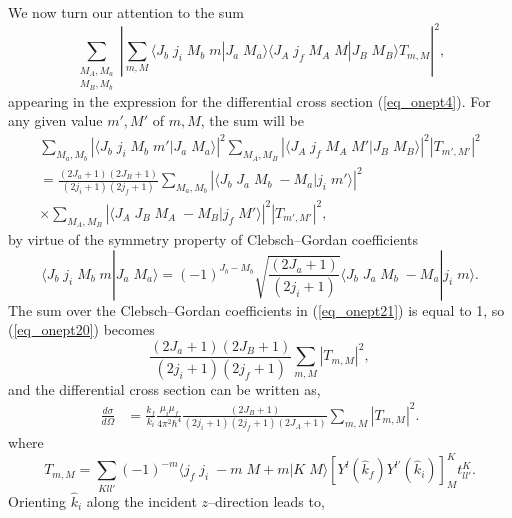 We now turn our attention to the sum
\begin{equation}\label{eq_onept20}
\sum_{\substack{M_A,M_a\\M_B,M_b}}\left|\sum_{m,M}\langle J_b\;j_i\;M_b\;m|J_a\;M_a\rangle\langle J_A\;j_f\;M_A\;M|J_B\;M_B\rangle T_{m,M}\right|^2,
\end{equation}
appearing in the expression for the differential cross section (\ref{eq_onept4}). For any given value $m',M'$ of $m,M$, the sum will be
\begin{multline}\label{eq_onept21}
\sum_{M_a,M_b}\left|\langle J_b\;j_i\;M_b\;m'|J_a\;M_a\rangle\right|^2\sum_{M_A,M_B}\left|\langle J_A\;j_f\;M_A\;M'|J_B\;M_B\rangle\right|^2 \left|T_{m',M'}\right|^2\\
=\frac{(2J_a+1)(2J_B+1)}{(2j_i+1)(2j_f+1)}\sum_{M_a,M_b}\left|\langle J_b\;J_a\;M_b\;-M_a|j_i\;m'\rangle\right|^2\\
\times\sum_{M_A,M_B}\left|\langle J_A\;J_B\;M_A\;-M_B|j_f\;M'\rangle\right|^2 \left|T_{m',M'}\right|^2,
\end{multline}
by virtue of the symmetry property of Clebsch--Gordan coefficients
\begin{equation}\label{eq_onept22}
\langle J_b\;j_i\;M_b\;m|J_a\;M_a\rangle=(-1)^{J_b-M_b}\sqrt{\frac{(2J_a+1)}{(2j_i+1)}}\langle J_b\;J_a\;M_b\;-M_a|j_i\;m\rangle.
\end{equation}
The sum over the Clebsch--Gordan coefficients in (\ref{eq_onept21}) is equal to 1, so (\ref{eq_onept20}) becomes
 \begin{equation}\label{eq_onept23}
\frac{(2J_a+1)(2J_B+1)}{(2j_i+1)(2j_f+1)}\sum_{m,M}\left|T_{m,M}\right|^2,
\end{equation}
and the differential cross section  can be written as,
\begin{equation}\label{eq_onept24} 
    \begin{split}
\frac{d\sigma}{d\Omega}&=\frac{k_f}{k_i}\frac{\mu_i\mu_f}{4\pi^2\hbar^4}
\frac{(2J_B+1)}{(2j_i+1)(2j_f+1)(2J_A+1)}\sum_{m,M}\left| T_{m,M}\right|^2.
    \end{split}
\end{equation}
where
\begin{equation}\label{eq_onept25}
T_{m,M}=\sum_{Kll'}(-1)^{-m}\langle j_f\;j_i\;-m\;M+m|K\;M\rangle\left[ Y^{l} (\hat k_f) Y^{l'} (\hat k_i)\right]^K_{M}t_{ll'}^K.
\end{equation}
Orienting $\hat k_i$ along the incident $z$--direction leads to, 



